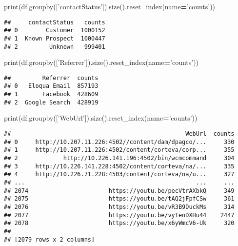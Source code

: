 \documentclass[
]{article}
\newenvironment{Shaded}{\begin{snugshade}}{\end{snugshade}}
\newcommand{\BuiltInTok}[1]{#1}
\newcommand{\NormalTok}[1]{#1}
\newcommand{\OperatorTok}[1]{\textcolor[rgb]{0.81,0.36,0.00}{\textbf{#1}}}
\newcommand{\StringTok}[1]{\textcolor[rgb]{0.31,0.60,0.02}{#1}}
\begin{document}
\begin{Shaded}
\begin{Highlighting}[]
\BuiltInTok{print}\NormalTok{(df.groupby([}\StringTok{'contactStatus'}\NormalTok{]).size().reset_index(name}\OperatorTok{=}\StringTok{'counts'}\NormalTok{))}
\end{Highlighting}
\end{Shaded}

\begin{verbatim}
##     contactStatus   counts
## 0        Customer  1000152
## 1  Known Prospect  1000447
## 2         Unknown   999401
\end{verbatim}

\begin{Shaded}
\begin{Highlighting}[]
\BuiltInTok{print}\NormalTok{(df.groupby([}\StringTok{'Referrer'}\NormalTok{]).size().reset_index(name}\OperatorTok{=}\StringTok{'counts'}\NormalTok{))}
\end{Highlighting}
\end{Shaded}

\begin{verbatim}
##         Referrer  counts
## 0   Eloqua Email  857193
## 1       Facebook  428609
## 2  Google Search  428919
\end{verbatim}

\begin{Shaded}
\begin{Highlighting}[]
\BuiltInTok{print}\NormalTok{(df.groupby([}\StringTok{'WebUrl'}\NormalTok{]).size().reset_index(name}\OperatorTok{=}\StringTok{'counts'}\NormalTok{))}
\end{Highlighting}
\end{Shaded}

\begin{verbatim}
##                                                  WebUrl  counts
## 0     http://10.207.11.226:4502//content/dam/dpagco/...     330
## 1     http://10.207.11.226:4502/content/corteva/corp...     355
## 2             http://10.226.141.196:4502/bin/wcmcommand     304
## 3     http://10.226.141.228:4502/content/corteva/na/...     335
## 4     http://10.226.71.228:4503/content/corteva/na/u...     327
## ...                                                 ...     ...
## 2074                       https://youtu.be/pecVtrAXbkQ     349
## 2075                       https://youtu.be/tAQ2jFpfCSw     361
## 2076                       https://youtu.be/vR3B9DuckMs     314
## 2077                       https://youtu.be/vyTenDXHu44    2447
## 2078                       https://youtu.be/x6yWmcV6-Uk     320
## 
## [2079 rows x 2 columns]
\end{verbatim}
\end{document}
